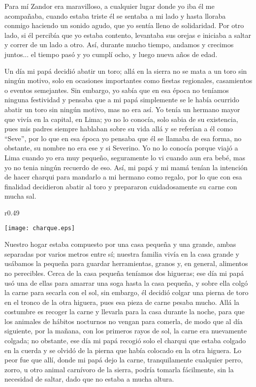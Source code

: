Para mí Zandor era maravilloso, a cualquier lugar donde yo iba él me acompañaba, cuando estaba triste él se sentaba a mi lado y hasta lloraba conmigo haciendo un sonido agudo, que yo sentía lleno de solidaridad.
Por otro lado, si él percibía que yo estaba contento, levantaba sus orejas e iniciaba a saltar y correr de un lado a otro. Así, durante mucho tiempo, andamos y crecimos juntos... el tiempo pasó y yo cumplí ocho, y luego nueva años de edad.

Un día mi papá decidió abatir un toro; allá en la sierra no se mata a un toro sin ningún motivo, solo en ocasiones importantes como fiestas regionales, casamientos o eventos semejantes. Sin embargo, yo sabía que en esa época no teníamos ninguna festividad y pensaba que a mi papá simplemente se le había ocurrido abatir un toro sin ningún motivo, mas no era así.
Yo tenía un hermano mayor que vivía en la capital, en Lima; yo no lo conocía, solo sabia de su existencia, pues mis padres siempre hablaban sobre su vida allá y se referían a él como ``Seve'', por lo que en esa época yo pensaba que él se llamaba de esa forma, no obstante, su nombre no era ese y si Severino. Yo no lo conocía porque viajó a Lima cuando yo era muy pequeño, seguramente lo vi cuando aun era bebé, mas yo no tenia ningún recuerdo de eso.
Así, mi papá y mi mamá tenían la intención de hacer charqui para mandarlo a mi hermano como regalo, por lo que con esa finalidad decidieron abatir al toro y prepararon cuidadosamente su carne con mucha sal.

\ifdefined\EnableIncludeImages
\begin{wrapfigure}{r}{0.49\textwidth}
  \begin{center}
  \vspace{-20pt}
    \texttt{[image: charque.eps]}
  \end{center}
  \vspace{-20pt}
\end{wrapfigure}
\fi
Nuestro hogar estaba compuesto por una casa pequeña y una grande, ambas separadas por varios metros entre sí; nuestra familia vivía en la casa grande y usábamos la pequeña para guardar herramientas, granos y, en general, alimentos no perecibles.
Cerca de la casa pequeña teníamos dos higueras; ese día mi papá usó una de ellas para amarrar una soga hasta la casa pequeña, y sobre ella colgó la carne para secarla con el sol, sin embargo, él decidió colgar una pierna de toro en el tronco de la otra higuera, pues esa pieza de carne pesaba mucho.
Allá la costumbre es recoger la carne y llevarla para la casa durante la noche, para que los animales de hábitos nocturnos no vengan para comerla, de modo que al día siguiente, por la mañana, con los primeros rayos de sol, la carne era nuevamente colgada; no obstante, ese día mi papá recogió solo el charqui que estaba colgado en la cuerda y se olvidó de la pierna que había colocado en la otra higuera.
Lo peor fue que allí, donde mi papá dejo la carne, tranquilamente cualquier perro, zorro, u otro animal carnívoro de la sierra, podría tomarla fácilmente, sin la necesidad de saltar, dado que no estaba a mucha altura.

